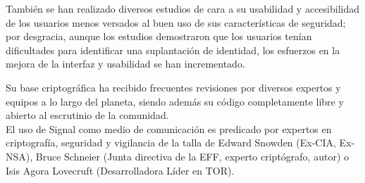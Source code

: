 También se han realizado diversos estudios de cara a su usabilidad y accesibilidad de los usuarios menos versados al buen uso de sus características de seguridad; por desgracia, aunque los estudios demostraron que los usuarios tenían dificultades para identificar una suplantación de identidad, los esfuerzos en la mejora de la interfaz y usabilidad se han incrementado.

Su base criptográfica ha recibido frecuentes revisiones por diversos expertos y equipos a lo largo del planeta, siendo además su código completamente libre y abierto al escrutinio de la comunidad. \\

El uso de Signal como medio de comunicación es predicado por expertos en criptografía, seguridad y vigilancia de la talla de Edward Snowden (Ex-CIA, Ex-NSA), Bruce Schneier (Junta directiva de la EFF, experto criptógrafo, autor) o Isis Agora Lovecruft (Desarrolladora Líder en TOR). \\
